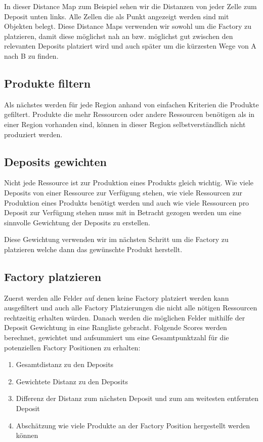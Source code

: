\documentclass[12pt,a4paper]{article}
\begin{document}
In dieser Distance Map zum Beispiel sehen wir die Distanzen von jeder Zelle zum Deposit unten links. Alle Zellen die als Punkt angezeigt werden sind mit Objekten belegt. Diese Distance Maps verwenden wir sowohl um die Factory zu platzieren, damit diese möglichst nah an bzw. möglichst gut zwischen den relevanten Deposits platziert wird und auch später um die kürzesten Wege von A nach B zu finden.

\subsection{Produkte filtern}
Als nächstes werden für jede Region anhand von einfachen Kriterien die Produkte gefiltert. Produkte die mehr Ressourcen oder andere Ressourcen benötigen als in einer Region vorhanden sind, können in dieser Region selbstverständlich nicht produziert werden.

\subsection{Deposits gewichten}
Nicht jede Ressource ist zur Produktion eines Produkts gleich wichtig. Wie viele Deposits  von einer Ressource zur Verfügung stehen, wie viele Ressourcen zur Produktion eines Produkts benötigt werden und auch wie viele Ressourcen pro Deposit zur Verfügung stehen muss mit in Betracht gezogen werden um eine sinnvolle Gewichtung der Deposits zu erstellen.


Diese Gewichtung verwenden wir im nächsten Schritt um die Factory zu platzieren welche dann das gewünschte Produkt herstellt.

\subsection{Factory platzieren}
Zuerst werden alle Felder auf denen keine Factory platziert werden kann ausgefiltert und auch alle Factory Platzierungen die nicht alle nötigen Ressourcen rechtzeitig erhalten würden. Danach werden die möglichen Felder mithilfe der Deposit Gewichtung in eine Rangliste gebracht.
Folgende Scores werden berechnet, gewichtet und aufsummiert um eine Gesamtpunktzahl für die potenziellen Factory Positionen zu erhalten:

\begin{enumerate}
    \item Gesamtdistanz zu den Deposits
    \item Gewichtete Distanz zu den Deposits
    \item Differenz der Distanz zum nächsten Deposit und zum am weitesten entfernten Deposit
    \item Abschätzung wie viele Produkte an der Factory Position hergestellt werden können 
\end{enumerate}
\end{document}
